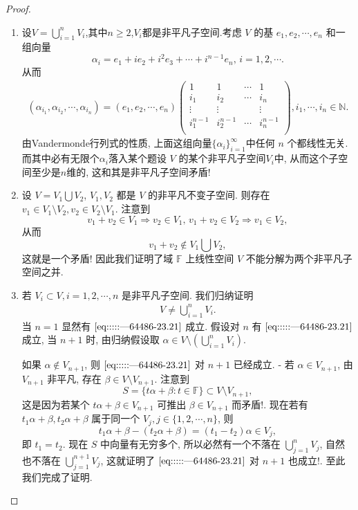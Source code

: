 \documentclass[../../main.tex]{subfiles}
\begin{document}
\begin{proof}
\begin{enumerate}
\item 设$V=\bigcup_{i=1}^n{V_i}$,其中$n\geqslant 2$,$V_i$都是非平凡子空间.考虑 \( V \) 的基 \( e_1, e_2, \cdots, e_n \) 和一组向量  
\[
\alpha_i = e_1 + i e_2 + i^2 e_3 + \cdots + i^{n-1} e_n, \, i = 1, 2, \cdots.
\] 
从而
\begin{align*}
\left( \alpha _{i_1},\alpha _{i_2},\cdots ,\alpha _{i_n} \right) =\left( e_1,e_2,\cdots ,e_n \right) \left( \begin{matrix}
1&		1&		\cdots&		1\\
i_1&		i_2&		\cdots&		i_n\\
\vdots&		\vdots&		&		\vdots\\
i_{1}^{n-1}&		i_{2}^{n-1}&		\cdots&		i_{n}^{n-1}\\
\end{matrix} \right) ,i_1,\cdots ,i_n\in \mathbb{N} .
\end{align*}
由Vandermonde行列式的性质, 上面这组向量$\{\alpha_i\}_{i=1}^{\infty}$中任何 \( n \) 个都线性无关. 而其中必有无限个$\alpha_i$落入某个题设 \( V \) 的某个非平凡子空间$V_i$中, 从而这个子空间至少是\( n \)维的, 这和其是非平凡子空间矛盾!  

\item 设 \( V = V_1 \bigcup V_2 \), \( V_1, V_2 \) 都是 \( V \) 的非平凡不变子空间. 则存在 \( v_1 \in V_1 \setminus V_2, v_2 \in V_2 \setminus V_1 \). 注意到
\[
v_1 + v_2 \in V_1 \Rightarrow v_2 \in V_1, \, v_1 + v_2 \in V_2 \Rightarrow v_1 \in V_2,
\]  
从而  
\[
v_1 + v_2 \notin V_1 \bigcup V_2,
\]  
这就是一个矛盾! 因此我们证明了域 \( \mathbb{F} \) 上线性空间 \( V \) 不能分解为两个非平凡子空间之并.  

\item 若 \( V_i \subset V, i = 1, 2, \cdots, n \) 是非平凡子空间. 我们归纳证明  
\begin{align}
V \neq \bigcup_{i=1}^n V_i. \label{eq:::::---64486-23.21}
\end{align}
当 \( n = 1 \) 显然有 \(\eqref{eq:::::---64486-23.21}\) 成立. 假设对 \( n \) 有 \(\eqref{eq:::::---64486-23.21}\) 成立, 当 \( n + 1 \) 时, 由归纳假设取 \( \alpha \in V \setminus \left( \bigcup_{i=1}^n V_i \right) \).  

如果 \( \alpha \notin V_{n+1} \), 则 \(\eqref{eq:::::---64486-23.21}\) 对 \( n + 1 \) 已经成立.  
- 若 \( \alpha \in V_{n+1} \), 由 \( V_{n+1} \) 非平凡, 存在 \( \beta \in V \setminus V_{n+1} \). 注意到  
\[
S = \{ t\alpha + \beta : t \in \mathbb{F} \} \subset V \setminus V_{n+1},
\]  
这是因为若某个 \( t\alpha + \beta \in V_{n+1} \) 可推出 \( \beta \in V_{n+1} \) 而矛盾!. 现在若有 \( t_1\alpha + \beta, t_2\alpha + \beta \) 属于同一个 \( V_j, j \in \{1, 2, \cdots, n\} \), 则  
\[
t_1\alpha + \beta - (t_2\alpha + \beta) = (t_1 - t_2) \alpha \in V_j,
\]  
即 \( t_1 = t_2 \). 现在 \( S \) 中向量有无穷多个, 所以必然有一个不落在 \( \bigcup_{j=1}^n V_j \), 自然也不落在 \( \bigcup_{j=1}^{n+1} V_j \), 这就证明了 \(\eqref{eq:::::---64486-23.21}\) 对 \( n + 1 \) 也成立!.  
至此我们完成了证明.
\end{enumerate}
\end{proof}
\end{document}
